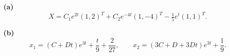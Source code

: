 \noindent\textbf{(a)} \[X=C_1e^{2t}(1,2)^T+C_2e^{-4t}(1,-4)^T-\tfrac15e^t(1,1)^T.\]

\noindent\textbf{(b)} \[x_1=(C+Dt)e^{3t}+\frac t9+\frac2{27},\qquad
x_2=(3C+D+3Dt)e^{3t}+\frac19.\]
